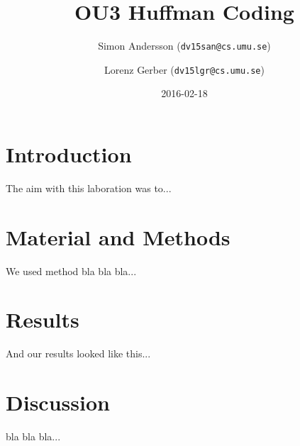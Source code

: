 \documentclass[a4paper,11pt,twoside]{article}
\title{OU3 Huffman Coding}
\author{Simon Andersson ({\tt{dv15san@cs.umu.se}})}
\author{Lorenz Gerber ({\tt{dv15lgr@cs.umu.se}})}
\date{2016-02-18}
\begin{document}
\lstset{language=C}
\maketitle

\tableofcontents
\newpage

\section{Introduction} 
The aim with this laboration was to...

\section{Material and Methods}
We used method bla bla bla...

\section{Results}
And our results looked like this...

\section{Discussion}

bla bla bla... 


\end{document}
